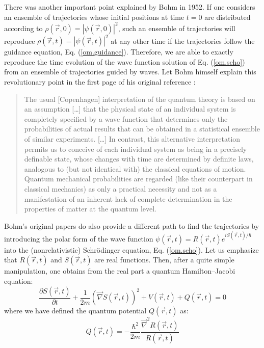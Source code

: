 \documentclass[onecolumn,nofootinbib, secnumarabic, amsmath, nobibnotes,11pt,aps,pra]{revtex4-1}
\newcommand{\eref}[1]{Eq. (\ref{#1})}
\begin{document}
There was another important point explained by Bohm in 1952. If one considers an ensemble of trajectories whose initial positions at time $t = 0$ are distributed according to $\rho(\vec{r},0) = |\psi(\vec{r},0)|^2$, such an ensemble of trajectories will reproduce $\rho(\vec{r},t) = |\psi(\vec{r},t)|^2$ at any other time if the trajectories follow the guidance equation, \eref{om.guidance}. Therefore, we are able to exactly reproduce the time evolution of the wave function solution of \eref{om.scho} from an ensemble of trajectories guided by waves. Let Bohm himself explain this revolutionary point in the first page of his original reference \cite{om.bohm1952a}:\\
\begin{quote}
The usual [Copenhagen] interpretation of the quantum theory is based
on an assumption [\ldots] that the physical state of an individual
system is completely specified by a wave function that determines
only the probabilities of actual results that can be obtained in a
statistical ensemble of similar experiments. [\ldots] In contrast,
this alternative interpretation permits us to conceive of each
individual system as being in a precisely definable state, whose
changes with time are determined by definite laws, analogous to (but
not identical with) the classical equations of motion. Quantum
mechanical probabilities are regarded (like their counterpart in
classical mechanics) as only a practical necessity and not as a
manifestation of an inherent lack of complete determination in the
properties of matter at the quantum level.\\
\end{quote}
Bohm's original papers do also provide a different path to find the trajectories by
introducing the polar form of the wave function $\psi(\vec{r},t) =
R(\vec{r},t) e^{i S(\vec{r},t)/\hbar}$ into the (nonrelativistic)
Schr\"odinger equation, \eref{om.scho}. Let us emphasize that
$R(\vec{r},t)$ and $S(\vec{r},t)$ are real functions. Then, after a
quite simple manipulation, one obtains from the real part a quantum
Hamilton--Jacobi equation:
\begin{equation}
\label{om.hamitlon2}
 \frac{\partial S(\vec{r},t)}{\partial t} + \frac{1}{2m} \left(\vec{\nabla} S(\vec{r},t)\right)^{2} + V(\vec{r},t) + Q(\vec{r},t) = 0
\end{equation}
where we have defined the quantum potential $Q(\vec{r},t)$ as:
\begin{equation}
\label{om.hamitlon3}
 Q(\vec{r},t) = -\frac{\hbar^{2}}{2 m} \frac{\vec{\nabla}^{2}R(\vec{r},t)}{R(\vec{r},t)}
\end{equation}
\end{document}
